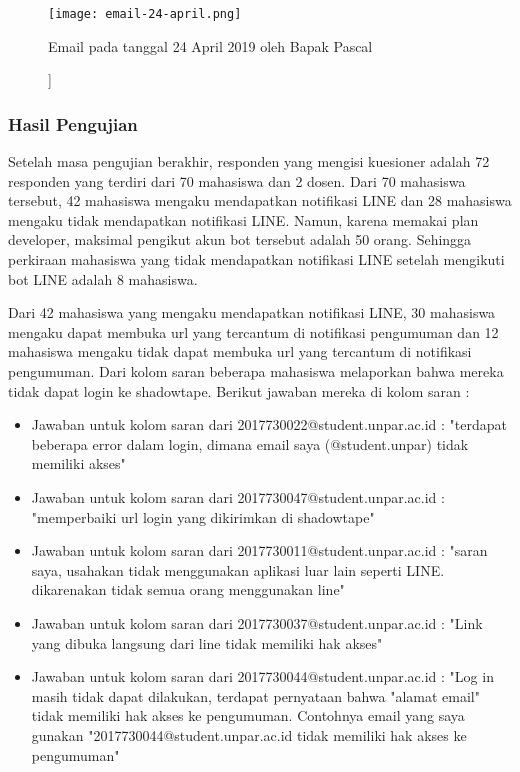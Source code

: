\begin{figure}[H]
	\centering  
	\texttt{[image: email-24-april.png]}  
	\caption[Email pada tanggal 24 April 2019 oleh Bapak Pascal]]{Email pada tanggal 24 April 2019 oleh Bapak Pascal} 
	\label{fig:email-24Apr} 
\end{figure}                         

\subsubsection{Hasil Pengujian}
Setelah masa pengujian berakhir, responden yang mengisi kuesioner adalah 72 responden yang terdiri dari 70 mahasiswa dan 2 dosen. Dari 70 mahasiswa tersebut, 42 mahasiswa mengaku mendapatkan notifikasi LINE dan 28 mahasiswa mengaku tidak mendapatkan notifikasi LINE. Namun, karena memakai plan developer, maksimal pengikut akun bot tersebut adalah 50 orang. Sehingga perkiraan mahasiswa yang tidak mendapatkan notifikasi LINE setelah mengikuti bot LINE adalah 8 mahasiswa.

Dari 42 mahasiswa yang mengaku mendapatkan notifikasi LINE, 30 mahasiswa mengaku dapat membuka url yang tercantum di notifikasi pengumuman dan 12 mahasiswa mengaku tidak dapat membuka url yang tercantum di notifikasi pengumuman. Dari kolom saran beberapa mahasiswa melaporkan bahwa mereka tidak dapat login ke shadowtape. Berikut jawaban mereka di kolom saran :
\begin{itemize}
  \item Jawaban untuk kolom saran dari 2017730022@student.unpar.ac.id : "terdapat beberapa error dalam login, dimana email saya (@student.unpar) tidak memiliki akses"
  \item Jawaban untuk kolom saran dari 2017730047@student.unpar.ac.id : "memperbaiki url login yang dikirimkan di shadowtape"
  \item Jawaban untuk kolom saran dari 2017730011@student.unpar.ac.id : "saran saya, usahakan tidak menggunakan aplikasi luar lain seperti LINE. dikarenakan tidak semua orang menggunakan line"
  \item Jawaban untuk kolom saran dari 2017730037@student.unpar.ac.id : "Link yang dibuka langsung dari line tidak memiliki hak akses"
  \item Jawaban untuk kolom saran dari 2017730044@student.unpar.ac.id : "Log in masih tidak dapat dilakukan, terdapat pernyataan bahwa "alamat email" tidak memiliki hak akses ke pengumuman. Contohnya email yang saya gunakan "2017730044@student.unpar.ac.id tidak memiliki hak akses ke pengumuman"
\end{itemize}


